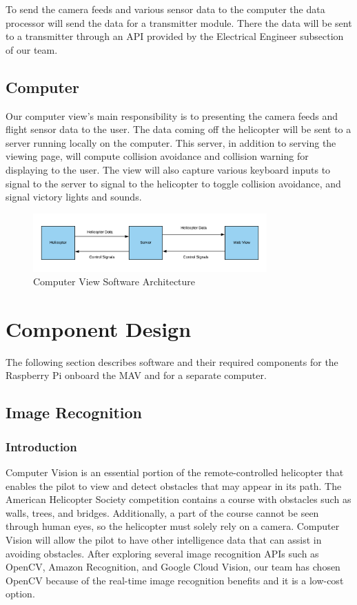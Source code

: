 \documentclass[onecolumn, draftclsnofoot, 10pt, compsoc]{IEEEtran}
\begin{document}
To send the camera feeds and various sensor data to the computer the data processor will send the data for a transmitter module. There the data will be sent to a transmitter through an API provided by the Electrical Engineer subsection of our team.

\subsection{Computer}
Our computer view's main responsibility is to presenting the camera feeds and flight sensor data to the user. The data coming off the helicopter will be sent to a server running locally on the computer. This server, in addition to serving the viewing page, will compute collision avoidance and collision warning for displaying to the user. The view will also capture various keyboard inputs to signal to the server to signal to the helicopter to toggle collision avoidance, and signal victory lights and sounds.

\begin{figure}[h]
    \centering
    \includegraphics[width=0.8\textwidth]{graphics/computer_diagram.png}
    \caption{Computer View Software Architecture}
    \label{fig:ComputerViewSoftwareArchitecture}
\end{figure}

\section{Component Design}
The following section describes software and their required components for the Raspberry Pi onboard the MAV and for a separate computer.

\subsection{Image Recognition}
\subsubsection{Introduction}
Computer Vision is an essential portion of the remote-controlled helicopter that enables the pilot to view and detect obstacles that may appear in its path. The American Helicopter Society competition contains a course with obstacles such as walls, trees, and bridges. Additionally, a part of the course cannot be seen through human eyes, so the helicopter must solely rely on a camera. Computer Vision will allow the pilot to have other intelligence data that can assist in avoiding obstacles. After exploring several image recognition APIs such as OpenCV, Amazon Recognition, and Google Cloud Vision, our team has chosen OpenCV because of the real-time image recognition benefits and it is a low-cost option.
\end{document}
